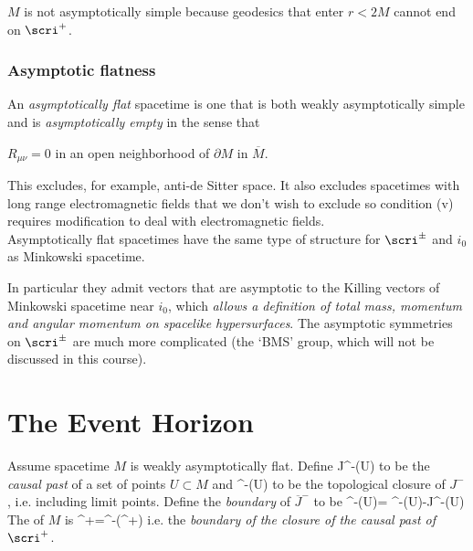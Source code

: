 \begin{list}{()}
\begin{list}{()}
\item $M$ is not asymptotically simple because geodesics that enter 
$r<2M$ cannot end on $\scri^+$.
\end{list}

\subsubsection{Asymptotic flatness}

An \emph{asymptotically flat} spacetime is one that is both weakly asymptotically simple and is \emph{asymptotically empty} in the sense that

\item $R_{\mu\nu}=0$ in an open neighborhood of $\partial M$ in $\overline{M}$.

\end{list}

This excludes, for example, anti-de Sitter space.  It also excludes 
spacetimes with long range electromagnetic fields that we don't wish to exclude
so condition (v) requires modification to deal with electromagnetic fields. \\

Asymptotically flat spacetimes have the same type of structure for 
$\scri^{\pm}$ and $i_0$ as Minkowski spacetime.
\begin{center}\end{center}
In particular they admit vectors that are asymptotic to the Killing 
vectors of Minkowski spacetime near $i_0$, which \emph{allows a definition of
total mass, momentum and angular momentum on spacelike hypersurfaces}.  The
asymptotic symmetries on $\scri^{\pm}$ are much more complicated (the `BMS'
group, which will not be discussed in this course).

\section{The Event Horizon}

Assume spacetime $M$ is weakly asymptotically flat.  Define
\bdm
J^-(U)
\edm
to be the \emph{causal past} of a set of points $U\subset M$ and 
\bdm
{}^-(U)
\edm
to be the topological closure of $J^-$, i.e. including limit points.  Define 
the \emph{boundary} of $\overline{J}^{-}$ to be
\be
{}^-(U)= ^-(U)-J^-(U)
\ee
The  of $M$ is
\be
\mcH^+=^-\left(\scri^+\right)
\ee
i.e. the \emph{boundary of the closure of the causal past of $\scri^+$}.

